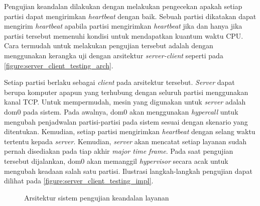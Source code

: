 Pengujian keandalan dilakukan dengan melakukan pengecekan apakah setiap partisi dapat
mengirimkan \textit{heartbeat} dengan baik. Sebuah partisi dikatakan dapat mengirim
\textit{heartbeat} apabila partisi mengirimkan \textit{heartbeat} jika dan hanya jika partisi
tersebut memenuhi kondisi untuk mendapatkan kuantum waktu CPU. Cara termudah untuk melakukan
pengujian tersebut adalah dengan menggunakan kerangka uji dengan arsitektur
\textit{server-client} seperti pada \autoref{figure:server_client_testing_arch}.

Setiap partisi berlaku sebagai \textit{client} pada arsitektur tersebut. \textit{Server} dapat
berupa komputer apapun yang terhubung dengan seluruh partisi menggunakan kanal TCP. Untuk
mempermudah, mesin yang digunakan untuk \textit{server} adalah dom0 pada sistem. Pada awalnya,
dom0 akan menggunakan \textit{hypercall} untuk mengubah penjadwalan partisi-partisi pada sistem
sesuai dengan skenario yang ditentukan.  Kemudian, setiap partisi mengirimkan \textit{heartbeat}
dengan selang waktu tertentu kepada \textit{server}.  Kemudian, \textit{server} akan mencatat
setiap layanan sudah pernah disediakan pada tiap akhir \textit{major time frame}. Pada saat
pengujian tersebut dijalankan, dom0 akan memanggil \textit{hypervisor} secara acak untuk
mengubah keadaan salah satu partisi. Ilustrasi langkah-langkah pengujian dapat dilihat pada
\autoref{figure:server_client_testing_impl}.

\begin{figure}[!ht]
	\centering
	\vspace{20pt}
	\caption{Arsitektur sistem pengujian keandalan layanan}
	\label{figure:server_client_testing_arch}
\end{figure}

